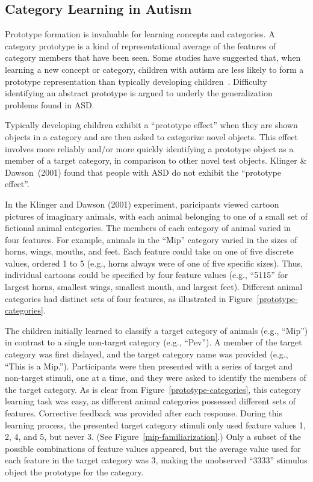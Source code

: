 %
%

\subsection{Category Learning in Autism}
Prototype formation is invaluable for learning concepts and categories. A category prototype is a kind of representational average of the features of category members that have been seen. Some studies have suggested that, when learning a new concept or category, children with autism are less likely to form a prototype representation than typically developing children~\cite{RefWorks:113,StraussMS:2009:Prototype}. Difficulty identifying an abstract prototype is argued to underly the generalization problems found in ASD.

Typically developing children exhibit a ``prototype effect'' when they are shown objects in a category and are then asked to categorize novel objects. This effect involves more reliably and/or more quickly identifying a prototype object as a member of a target category, in comparison to other novel test objects. Klinger \& Dawson~(2001) \nocite{RefWorks:113} found that people with ASD do not exhibit the ``prototype effect''.

In the Klinger and Dawson (2001) experiment, paricipants viewed cartoon pictures of imaginary animals, with each animal belonging to one of a small set of fictional animal categories. The members of each category of animal varied in four features. For example, animals in the ``Mip'' category varied in the sizes of horns, wings, mouths, and feet. Each feature could take on one of five discrete values, ordered 1 to 5 (e.g., horns always were of one of five specific sizes). Thus, individual cartoons could be specified by four feature values (e.g., ``5115'' for largest horns, smallest wings, smallest mouth, and largest feet). Different animal categories had distinct sets of four features, as illustrated in Figure~\ref{prototype-categories}.

The children initially learned to classify a target category of animals (e.g., ``Mip'') in contrast to a single non-target category (e.g., ``Pev''). A member of the target category was first dislayed, and the target category name was provided (e.g., ``This is a Mip.''). Participants were then presented with a series of target and non-target stimuli, one at a time, and they were asked to identify the members of the target category. As is clear from Figure~\ref{prototype-categories}, this category learning task was easy, as different animal categories possessed different sets of features. Corrective feedback was provided after each response. During this learning process, the presented target category stimuli only used feature values 1, 2, 4, and 5, but never 3. (See Figure~\ref{mip-familiarization}.) Only a subset of the possible combinations of feature values appeared, but the average value used for each feature in the target category was 3, making the unobserved ``3333'' stimulus object the prototype for the category.

